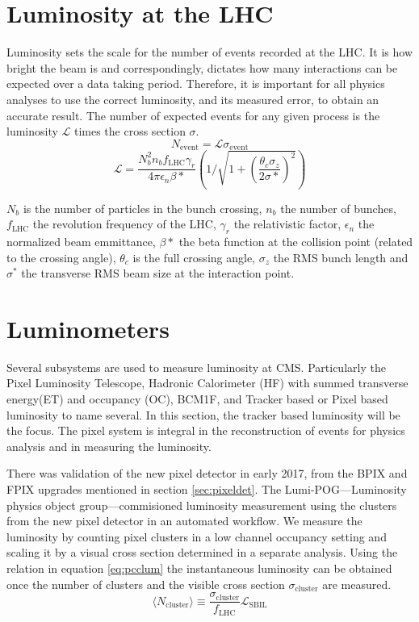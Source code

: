 \section{Luminosity at the LHC}
Luminosity sets the scale for the number of events recorded at the LHC. It is how bright the beam is and correspondingly, dictates how many interactions can be expected over a data taking period. Therefore, it is important for all physics analyses to use the correct luminosity, and its measured error, to obtain an accurate result. The number of expected events for any given process is the luminosity $\mathcal{L}$ times the cross section $\sigma$.  
\begin{equation}
N_{\text{event}} = \mathcal{L} \sigma_{\text{event}}
\end{equation}
\begin{equation}
\mathcal{L} = \frac{N_b^2 n_b f_\text{LHC} \gamma_r}{4\pi\epsilon_n \beta*}\left( 1 / \sqrt{1+ (\frac{\theta_c \sigma_z}{2\sigma*})^2} \right)
\end{equation}

$N_b$ is the number of particles in the bunch crossing, $n_b$ the number of bunches, $f_{\text{LHC}}$ the revolution frequency of the LHC, $\gamma_r$ the relativistic factor, $\epsilon_n$ the normalized beam emmittance, $\beta*$ the beta function at the collision point (related to the crossing angle), $\theta_c$ is the full crossing angle, $\sigma_z$ the RMS bunch length and $\sigma^*$ the transverse RMS beam size at the interaction point.

\section{Luminometers}
Several subsystems are used to measure luminosity at CMS. Particularly the Pixel Luminosity Telescope, Hadronic Calorimeter (HF) with summed transverse energy(ET) and occupancy (OC), BCM1F, and Tracker based or Pixel based luminosity to name several. 
In this section, the tracker based luminosity will be the focus. The pixel system is integral in the reconstruction of events for physics analysis and in measuring the luminosity.

There was validation of the new pixel detector in early 2017, from the BPIX and FPIX upgrades mentioned in section \ref{sec:pixeldet}. The Lumi-POG---Luminosity physics object group---commisioned luminosity measurement using the clusters from the new pixel detector in an automated workflow. 
We measure the luminosity by counting pixel clusters in a low channel occupancy setting and scaling it by a visual cross section determined in a separate analysis. Using the relation in equation \ref{eq:pcclum} the instantaneous luminosity can be obtained once the number of clusters and the visible cross section $\sigma_\text{cluster}$ are measured. 
\begin{equation}
\label{eq:pcclum}
\langle N_{\text{cluster}}\rangle\equiv\frac{\sigma_{\text{cluster}}}{f_{\text{LHC}}}\mathcal{L}_{\text{SBIL}}
\end{equation}

